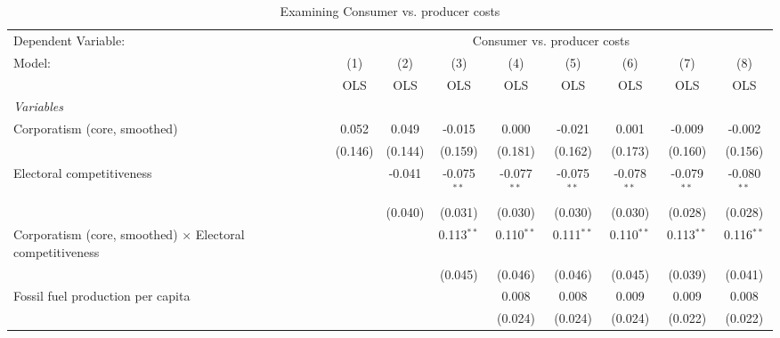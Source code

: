 
\begin{table}[htbp]
   \caption{Examining Consumer vs. producer costs}
   \centering
   \begin{tabular}{lcccccccc}
      \toprule
      Dependent Variable: & \multicolumn{8}{c}{Consumer vs. producer costs}\\
      Model:                                                           & (1)     & (2)     & (3)           & (4)           & (5)           & (6)           & (7)           & (8)\\  
                                                                       &  OLS    & OLS     & OLS           & OLS           & OLS           & OLS           & OLS           & OLS\\  
      \midrule
      \emph{Variables}\\
      Corporatism (core, smoothed)                                     & 0.052   & 0.049   & -0.015        & 0.000         & -0.021        & 0.001         & -0.009        & -0.002\\   
                                                                       & (0.146) & (0.144) & (0.159)       & (0.181)       & (0.162)       & (0.173)       & (0.160)       & (0.156)\\   
      Electoral competitiveness                                        &         & -0.041  & -0.075$^{**}$ & -0.077$^{**}$ & -0.075$^{**}$ & -0.078$^{**}$ & -0.079$^{**}$ & -0.080$^{**}$\\   
                                                                       &         & (0.040) & (0.031)       & (0.030)       & (0.030)       & (0.030)       & (0.028)       & (0.028)\\   
      Corporatism (core, smoothed) $\times$ Electoral competitiveness  &         &         & 0.113$^{**}$  & 0.110$^{**}$  & 0.111$^{**}$  & 0.110$^{**}$  & 0.113$^{**}$  & 0.116$^{**}$\\   
                                                                       &         &         & (0.045)       & (0.046)       & (0.046)       & (0.045)       & (0.039)       & (0.041)\\   
      Fossil fuel production per capita                                &         &         &               & 0.008         & 0.008         & 0.009         & 0.009         & 0.008\\   
                                                                       &         &         &               & (0.024)       & (0.024)       & (0.024)       & (0.022)       & (0.022)\\   

\end{tabular}
\end{table}
